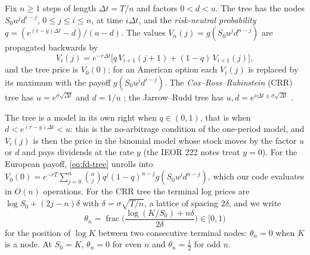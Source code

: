 \begin{definition}\label{def:fd-tree}
Fix $n\ge1$ steps of length $\Delta t=T/n$ and factors $0<d<u$. The tree has the nodes
$S_0u^jd^{i-j}$, $0\le j\le i\le n$, at time $i\Delta t$, and the \emph{risk-neutral probability}
$q=(e^{(r-y)\Delta t}-d)/(u-d)$. The values $V_n(j)=g(S_0u^jd^{n-j})$ are propagated backwards by
\begin{equation}\label{eq:fd-tree}
  V_i(j)=e^{-r\Delta t}\big[q\,V_{i+1}(j+1)+(1-q)\,V_{i+1}(j)\big],
\end{equation}
and the tree price is $V_0(0)$; for an American option each $V_i(j)$ is replaced by its maximum
with the payoff $g(S_0u^jd^{i-j})$. The \emph{Cox--Ross--Rubinstein} (CRR) tree has $u=e^{\sigma\sqrt{\Delta t}}$ and
$d=1/u$ \citep{crr1979}; the Jarrow--Rudd tree has $u,d=e^{\nu\Delta t\pm\sigma\sqrt{\Delta t}}$ \citep{jarrow-rudd-1983}.
\end{definition}

The tree is a model in its own right when $q\in(0,1)$, that is when $d<e^{(r-y)\Delta t}<u$: this is
the no-arbitrage condition of the one-period model, and $V_i(j)$ is then the price in the
binomial model whose stock moves by the factor $u$ or $d$ and pays dividends at the rate $y$
(the IEOR 222 notes treat $y=0$). For the European payoff, \eqref{eq:fd-tree} unrolls into
$V_0(0)=e^{-rT}\sum_{j=0}^n\binom nj q^j(1-q)^{n-j}g(S_0u^jd^{n-j})$, which our code evaluates in $O(n)$
operations. For the CRR tree the terminal log prices are $\log S_0+(2j-n)\delta$ with
$\delta=\sigma\sqrt{T/n}$, a lattice of spacing $2\delta$, and we write
\[
  \theta_n=\operatorname{frac}\Big(\frac{\log(K/S_0)+n\delta}{2\delta}\Big)\in[0,1)
\]
for the position of $\log K$ between two consecutive terminal nodes: $\theta_n=0$ when $K$ is a
node. At $S_0=K$, $\theta_n=0$ for even $n$ and $\theta_n=\frac12$ for odd $n$.

